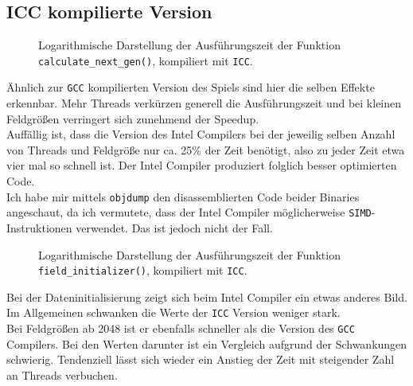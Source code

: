 \documentclass[german,plainarticle,hyperref,utf8]{zihpub}
\begin{document}
	\subsection{ICC kompilierte Version}
	\begin{figure}[h]
		\begin{center}
			
		\end{center}
		\caption{Logarithmische Darstellung der Ausführungszeit der Funktion \texttt{calculate\_next\_gen()}, kompiliert mit \texttt{ICC}.}
	\end{figure}
	Ähnlich zur \texttt{GCC} kompilierten Version des Spiels sind hier die selben Effekte erkennbar. Mehr Threads verkürzen generell die Ausführungszeit und bei kleinen Feldgrößen verringert sich zunehmend der Speedup.\\
	Auffällig ist, dass die Version des Intel Compilers bei der jeweilig selben Anzahl von Threads und Feldgröße nur ca. 25\% der Zeit benötigt, also zu jeder Zeit etwa vier mal so schnell ist. Der Intel Compiler produziert folglich besser optimierten Code.\\
	Ich habe mir mittels \texttt{objdump} den disassemblierten Code beider Binaries angeschaut, da ich vermutete, dass der Intel Compiler möglicherweise \texttt{SIMD}-Instruktionen verwendet. Das ist jedoch nicht der Fall.
	\newpage
	\begin{figure}[h]
		\begin{center}
			
		\end{center}
		\caption{Logarithmische Darstellung der Ausführungszeit der Funktion \texttt{field\_initializer()}, kompiliert mit \texttt{ICC}.}
	\end{figure}
	Bei der Dateninitialisierung zeigt sich beim Intel Compiler ein etwas anderes Bild. Im Allgemeinen schwanken die Werte der \texttt{ICC} Version weniger stark.\\
	Bei Feldgrößen ab 2048 ist er ebenfalls schneller als die Version des \texttt{GCC} Compilers. Bei den Werten darunter ist ein Vergleich aufgrund der Schwankungen schwierig. Tendenziell lässt sich wieder ein Anstieg der Zeit mit steigender Zahl an Threads verbuchen.
	\newpage
\end{document}
